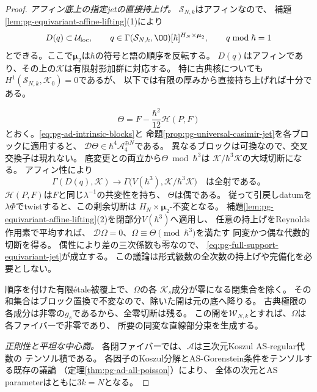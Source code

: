 \begin{proof}
\emph{アフィン底上の指定jetの直接持上げ。}
$\mathcal S_{N,k}$はアフィンなので、
補題\ref{lem:pg-equivariant-affine-lifting}(1)により
\begin{equation}
 D(q)\subset\mathcal U_{\mathrm{loc}},\qquad
 q\in\Gamma(\mathcal S_{N,k},\OO)[\hbar]^{H_N\times\boldsymbol\mu_2},
 \qquad q\bmod\hbar=1
 \label{eq:pg-full-support-affine-good-open}
\end{equation}
とできる。ここで$\boldsymbol\mu_2$は$\hbar$の符号と語の順序を反転する。
$D(q)$はアフィンであり、その上の$\mathcal K$は有限射影加群に対応する。
特に古典核についても$H^1(\mathcal S_{N,k},\mathcal K_0)=0$であるが、
以下では有限の厚みから直接持ち上げれば十分である。

\begin{equation}
 \Theta=F-\frac{\hbar^2}{12}\mathscr H(P,F)
 \label{eq:pg-full-support-prescribed-theta}
\end{equation}
とおく。\eqref{eq:pg-ad-intrinsic-blocks}と
命題\ref{prop:pg-universal-casimir-jet}を各ブロックに適用すると、
$\mathcal D\Theta\in\hbar^4\mathcal A_4^{\oplus N}$である。
異なるブロックは可換なので、交叉交換子は現れない。
底変更との両立から$\Theta\bmod\hbar^3$は
$\mathcal K/\hbar^3\mathcal K$の大域切断になる。
アフィン性により
\begin{equation}
 \Gamma(D(q),\mathcal K)\longrightarrow
 \Gamma\bigl(V(\hbar^3),\mathcal K/\hbar^3\mathcal K\bigr)
 \quad\text{は全射である。}
 \label{eq:pg-full-support-jet-lift-surjection}
\end{equation}
$\mathscr H(P,F)$は$F$と同じ$\lambda^{-1}$の共変性を持ち、
$\Theta$は偶である。
従って引戻しdatumを$\lambda\Phi$でtwistすると、この剰余切断は
$H_N\times\boldsymbol\mu_2$-不変となる。
補題\ref{lem:pg-equivariant-affine-lifting}(2)を閉部分$V(\hbar^3)$へ適用し、
任意の持上げをReynolds作用素で平均すれば、
$\mathcal D\Omega=0$、$\Omega\equiv\Theta\pmod{\hbar^3}$を満たす
同変かつ偶な代数的切断を得る。
偶性により差の三次係数も零なので、
\eqref{eq:pg-full-support-equivariant-jet}が成立する。
この議論は形式級数の全次数の持上げや完備化を必要としない。

順序を付けた有限\'{e}tale被覆上で、$\Omega$の各
$\mathcal K_s$成分が零になる閉集合を除く。
その和集合はブロック置換で不変なので、除いた開は元の底へ降りる。
古典極限の各成分は非零の$g_s$であるから、全零切断は残る。
この開を$\mathcal W_{N,k}$とすれば、$\Omega$は各ファイバーで非零であり、
所要の同変な直線部分束を生成する。

\emph{正則性と平坦な中心商。}
各閉ファイバーでは、$\mathcal A$は三次元Koszul AS-regular代数の
テンソル積である。
各因子のKoszul分解とAS-Gorenstein条件をテンソルする既存の議論
（定理\ref{thm:pg-ad-all-poisson}）により、
全体の次元とAS parameterはともに$3k=N$となる。


\end{proof}
